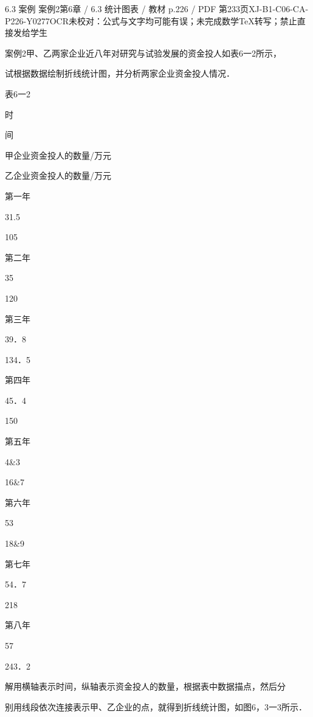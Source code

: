 \begin{bankitem}{6.3 案例 案例2}{第6章 / 6.3 统计图表 / 教材 p.226 / PDF 第233页}{XJ-B1-C06-CA-P226-Y0277}{OCR未校对：公式与文字均可能有误；未完成数学TeX转写；禁止直接发给学生}
\begin{ocrdraft}
\par
案例2甲、乙两家企业近八年对研究与试验发展的资金投人如表6一2所示，
\par
试根据数据绘制折线统计图，并分析两家企业资金投人情况．
\par
表6一2
\par
时
\par
间
\par
甲企业资金投人的数量/万元
\par
乙企业资金投人的数量/万元
\par
第一年
\par
31.5
\par
105
\par
第二年
\par
35
\par
120
\par
第三年
\par
39．8
\par
134．5
\par
第四年
\par
45．4
\par
150
\par
第五年
\par
4\&3
\par
16\&7
\par
第六年
\par
53
\par
18\&9
\par
第七年
\par
54．7
\par
218
\par
第八年
\par
57
\par
243．2
\par
解用横轴表示时间，纵轴表示资金投人的数量，根据表中数据描点，然后分
\par
别用线段依次连接表示甲、乙企业的点，就得到折线统计图，如图6，3一3所示．
\par

\end{ocrdraft}
\end{bankitem}
